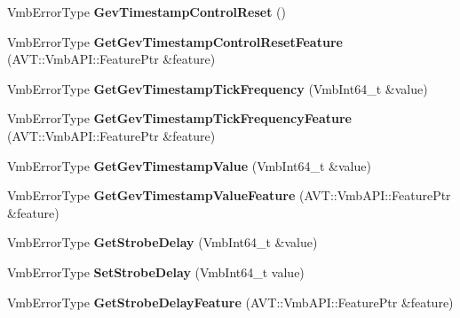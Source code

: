 \begin{DoxyCompactItemize}
\item 
\hypertarget{classMakoCamera_a9d5733515070ee91198c81d9a188af73}{Vmb\-Error\-Type {\bfseries Gev\-Timestamp\-Control\-Reset} ()}\label{classMakoCamera_a9d5733515070ee91198c81d9a188af73}

\item 
\hypertarget{classMakoCamera_a0e10bc22eddc8dbea67b4a1c867201e9}{Vmb\-Error\-Type {\bfseries Get\-Gev\-Timestamp\-Control\-Reset\-Feature} (A\-V\-T\-::\-Vmb\-A\-P\-I\-::\-Feature\-Ptr \&feature)}\label{classMakoCamera_a0e10bc22eddc8dbea67b4a1c867201e9}

\item 
\hypertarget{classMakoCamera_a8c5d5dbc896823f51825a07b0af2d84b}{Vmb\-Error\-Type {\bfseries Get\-Gev\-Timestamp\-Tick\-Frequency} (Vmb\-Int64\-\_\-t \&value)}\label{classMakoCamera_a8c5d5dbc896823f51825a07b0af2d84b}

\item 
\hypertarget{classMakoCamera_a06b3428054d7f253e8ae83d8b6fda2e6}{Vmb\-Error\-Type {\bfseries Get\-Gev\-Timestamp\-Tick\-Frequency\-Feature} (A\-V\-T\-::\-Vmb\-A\-P\-I\-::\-Feature\-Ptr \&feature)}\label{classMakoCamera_a06b3428054d7f253e8ae83d8b6fda2e6}

\item 
\hypertarget{classMakoCamera_aefb37abd217458f66e0138506206bb85}{Vmb\-Error\-Type {\bfseries Get\-Gev\-Timestamp\-Value} (Vmb\-Int64\-\_\-t \&value)}\label{classMakoCamera_aefb37abd217458f66e0138506206bb85}

\item 
\hypertarget{classMakoCamera_a0c38a5887175600d29a5bc9693d3bef5}{Vmb\-Error\-Type {\bfseries Get\-Gev\-Timestamp\-Value\-Feature} (A\-V\-T\-::\-Vmb\-A\-P\-I\-::\-Feature\-Ptr \&feature)}\label{classMakoCamera_a0c38a5887175600d29a5bc9693d3bef5}

\item 
\hypertarget{classMakoCamera_a4d54821ec511851f843150624e3569e7}{Vmb\-Error\-Type {\bfseries Get\-Strobe\-Delay} (Vmb\-Int64\-\_\-t \&value)}\label{classMakoCamera_a4d54821ec511851f843150624e3569e7}

\item 
\hypertarget{classMakoCamera_a74399fca4109ef379983de342937e793}{Vmb\-Error\-Type {\bfseries Set\-Strobe\-Delay} (Vmb\-Int64\-\_\-t value)}\label{classMakoCamera_a74399fca4109ef379983de342937e793}

\item 
\hypertarget{classMakoCamera_a77b5be1dc46c5a5ea2ec301bc65896de}{Vmb\-Error\-Type {\bfseries Get\-Strobe\-Delay\-Feature} (A\-V\-T\-::\-Vmb\-A\-P\-I\-::\-Feature\-Ptr \&feature)}\label{classMakoCamera_a77b5be1dc46c5a5ea2ec301bc65896de}


\end{DoxyCompactItemize}
